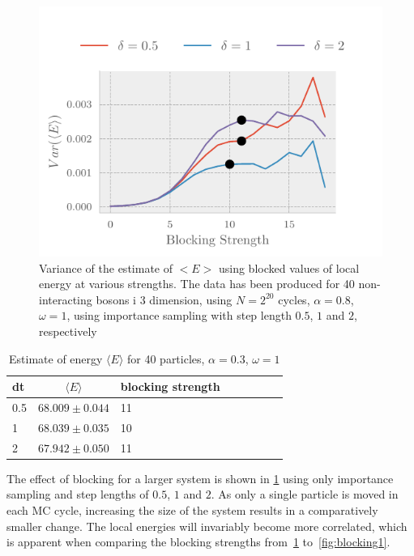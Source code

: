 \begin{figure}[ht]
	\centering
	\includegraphics[]{figures/blocking3.pdf}
	\caption{Variance of the estimate of $<E>$ using blocked values of local energy at various strengths. The data has been produced for 40 non-interacting bosons i 3 dimension, using $N = 2^{20}$ cycles, $\alpha = 0.8$, $\omega = 1$, using importance sampling with step length $0.5$, $1$ and $2$, respectively}
	\label{fig:blocking2}
\end{figure}

\begin{table}[t]
	\begin{tabular}{lclclclc}
		\hline
		\hline
      dt & \(\langle E \rangle \)& blocking strength\\
		\hline
		0.5 & \(68.009 \pm 0.044\) & 11\\
		1 & \(68.039 \pm 0.035\) & 10\\
		2 & \(67.942 \pm 0.050\) & 11\\
		\hline
	\end{tabular}
	\caption{Estimate of energy $\langle E \rangle$ for 40 particles, $\alpha = 0.3$, $\omega = 1$}
	\label{tab:blocking}
\end{table}

The effect of blocking for a larger system is shown in
\cref{fig:blocking2} using only importance sampling and step lengths of
$0.5$, $1$ and $2$. As only a single particle is moved in each MC cycle,
increasing the size of the system results in a comparatively smaller change.
The local energies will invariably become more correlated, which is apparent
when comparing the blocking strengths from~\cref{fig:blocking2} to~\cref{fig:blocking1}.

